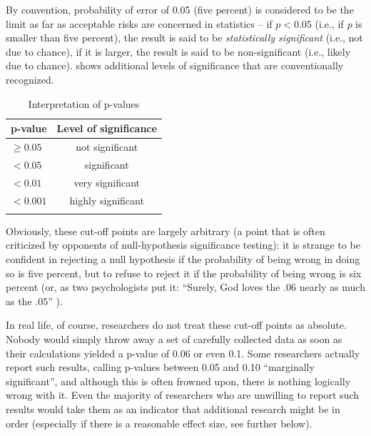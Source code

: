 By convention, probability  of error of 0.05 (five percent) is considered to be the limit as far as acceptable risks are concerned in statistics  -- if $p < 0.05$ (i.e., if \textit{p} is smaller than five percent), the result is said to be \textit{statistically significant}  (i.e., not due to chance),  if it is larger, the result is said to be non\hyp{}significant (i.e., likely due to chance).    shows additional levels of significance that are conventionally recognized.

\begin{table}
\caption{Interpretation of p\hyp{}values}
\label{tab:plevels}
\begin{tabular}[t]{lc}
\lsptoprule
p\hyp{}value & Level of significance \\
\midrule
$\geq 0.05$ & not significant \\
$< 0.05$ & significant \\
$< 0.01$ & very significant \\
$< 0.001$ & highly significant \\
\lspbottomrule
\end{tabular}
\end{table}

Obviously, these cut\hyp{}off points are largely arbitrary (a point that is often criticized by opponents of null\hyp{}hypothesis significance  testing): it is strange to be confident in rejecting a null hypothesis  if the probability  of being wrong in doing so is five percent, but to refuse to reject it if the probability of being wrong is six percent (or, as two psychologists  put it: ``Surely, God loves the .06 nearly as much as the .05'' \citep[1277]{rosnow_statistical_1989}).

In real life, of course, researchers do not treat these cut\hyp{}off points as absolute. Nobody would simply throw away a set of carefully collected data as soon as their calculations yielded a p\hyp{}value  of 0.06 or even 0.1. Some researchers actually report such results, calling p\hyp{}values between 0.05 and 0.10 ``marginally significant'',  and although this is often frowned upon, there is nothing logically wrong with it. Even the majority of researchers who are unwilling to report such results would take them as an indicator that additional research might be in order (especially if there is a reasonable effect size,  see further below).

